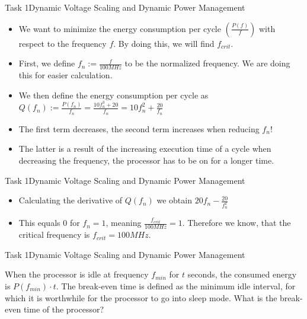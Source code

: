 \begin{frame}{Task 1}{Dynamic Voltage Scaling and Dynamic Power Management}
    \begin{solutionnoinc}
        \begin{itemize}
            \item We want to minimize the energy consumption per cycle $(\frac{P(f)}{f})$ with respect to the frequency $f$. By doing this, we will find $f_{crit}$.
            \item First, we define $f_n := \frac{f}{100 MHz}$ to be the normalized frequency. We are doing this for easier calculation.
            \item We then define the energy consumption per cycle as $Q(f_n) := \frac{P(f_n)}{f_n} = \frac{10f_n^3+20}{f_n} = 10f_n^2 + \frac{20}{f_n}$
            \item The first term \alert{decreases}, the second term \alert{increases} when reducing $f_n$!
            \item The latter is a result of the increasing execution time of a cycle when decreasing the frequency, the processor has to be on for a longer time.
        \end{itemize}
    \end{solutionnoinc}
\end{frame}
\begin{frame}{Task 1}{Dynamic Voltage Scaling and Dynamic Power Management}
    \begin{solution}
        \begin{itemize}
            \item Calculating the derivative of $Q(f_n)$ we obtain $20f_n - \frac{20}{f_n^2}$
            \item This equals 0 for $f_n = 1$, meaning $\frac{f_{crit}}{100 MHz} = 1$. Therefore we know, that the critical frequency is $f_{crit} = 100 MHz$.
        \end{itemize}
    \end{solution}
\end{frame}
\begin{frame}{Task 1}{Dynamic Voltage Scaling and Dynamic Power Management}
    \begin{tasknoinc}
        When the processor is idle at frequency $f_{min}$ for $t$ seconds, the consumed energy is $P(f_{min}) \cdot t$. The break-even time is defined as the minimum idle interval, for which it is worthwhile for the processor to go into sleep mode. What is the break-even time of the processor?
    \end{tasknoinc}
\end{frame}
